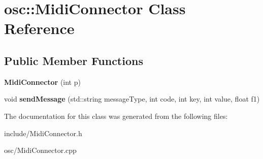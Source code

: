 \hypertarget{classosc_1_1MidiConnector}{}\section{osc\+:\+:Midi\+Connector Class Reference}
\label{classosc_1_1MidiConnector}
\subsection*{Public Member Functions}
\begin{DoxyCompactItemize}
\item 
{\bfseries Midi\+Connector} (int p)\hypertarget{classosc_1_1MidiConnector_a1629e8c842409a21dbc78258794556cc}{}\label{classosc_1_1MidiConnector_a1629e8c842409a21dbc78258794556cc}

\item 
void {\bfseries send\+Message} (std\+::string message\+Type, int code, int key, int value, float f1)\hypertarget{classosc_1_1MidiConnector_a700ee4383b29cd2bdc73f7cfc61a360e}{}\label{classosc_1_1MidiConnector_a700ee4383b29cd2bdc73f7cfc61a360e}

\end{DoxyCompactItemize}


The documentation for this class was generated from the following files\+:\begin{DoxyCompactItemize}
\item 
include/Midi\+Connector.\+h\item 
osc/Midi\+Connector.\+cpp\end{DoxyCompactItemize}
